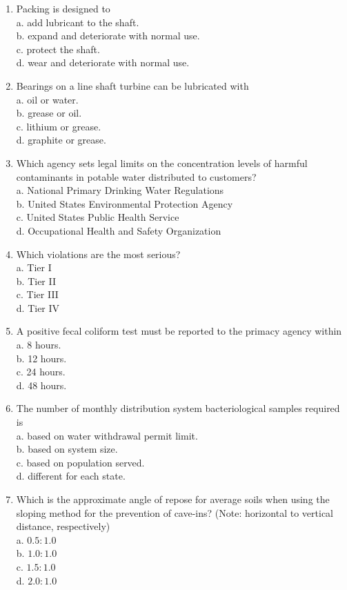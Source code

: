 \documentclass[10pt]{article}
\begin{document}
\begin{enumerate}
  \item Packing is designed to\\
a. add lubricant to the shaft.\\
b. expand and deteriorate with normal use.\\
c. protect the shaft.\\
d. wear and deteriorate with normal use.

  \item Bearings on a line shaft turbine can be lubricated with\\
a. oil or water.\\
b. grease or oil.\\
c. lithium or grease.\\
d. graphite or grease.

  \item Which agency sets legal limits on the concentration levels of harmful contaminants in potable water distributed to customers?\\
a. National Primary Drinking Water Regulations\\
b. United States Environmental Protection Agency\\
c. United States Public Health Service\\
d. Occupational Health and Safety Organization

  \item Which violations are the most serious?\\
a. Tier I\\
b. Tier II\\
c. Tier III\\
d. Tier IV

  \item A positive fecal coliform test must be reported to the primacy agency within\\
a. 8 hours.\\
b. 12 hours.\\
c. 24 hours.\\
d. 48 hours.

  \item The number of monthly distribution system bacteriological samples required is\\
a. based on water withdrawal permit limit.\\
b. based on system size.\\
c. based on population served.\\
d. different for each state.

  \item Which is the approximate angle of repose for average soils when using the sloping method for the prevention of cave-ins? (Note: horizontal to vertical distance, respectively)\\
a. $0.5: 1.0$\\
b. $1.0: 1.0$\\
c. $1.5: 1.0$\\
d. $2.0: 1.0$


\end{enumerate}
\end{document}
